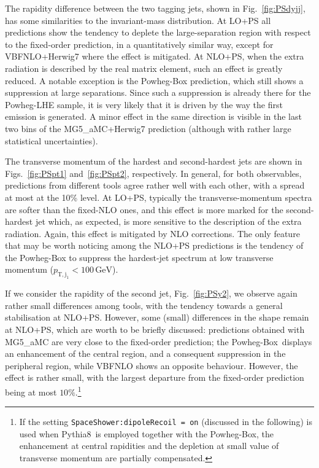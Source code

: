 \documentclass[twocolumn,epjc3]{svjour3} %
\newcommand{\Pj}{\ensuremath{\text{j}}\xspace}
\newcommand{\GeV}{\ensuremath{\,\text{GeV}}\xspace}
\newcommand{\ptsub}[1]{\ensuremath{p_{\text{T},#1}}\xspace}
\begin{document}
The rapidity difference between the two tagging jets, shown in Fig.~\ref{fig:PSdyjj}, has some similarities to the invariant-mass distribution.
At LO+PS all predictions show the tendency to deplete the large-separation region with respect to the fixed-order prediction, in a
quantitatively similar way,
except for {\sc VBFNLO+Herwig7} where the effect is mitigated. At 
NLO+PS, when the extra radiation is described by the real matrix element, such an effect is greatly reduced. A notable
exception is the {\sc Powheg-Box} prediction, which still shows a suppression at large separations.
Since such a suppression is already there for the {\sc Powheg-LHE} sample,
it is very likely that it is driven by the way the first emission is generated. A minor effect in the same direction is visible in the last two bins of the
{\sc MG5\_aMC+Herwig7} prediction (although with rather large statistical uncertainties).



The transverse momentum of the hardest and second-hardest jets are shown in Figs.~\ref{fig:PSpt1} and~\ref{fig:PSpt2}, respectively. In general, for both observables,
predictions from different tools agree rather well with each other, with a spread at most at the 10\% level. At LO+PS, typically the transverse-momentum spectra are softer than
the fixed-NLO ones, and this effect is more marked for the second-hardest jet which, as expected, is more sensitive to the description of the extra radiation. Again, this
effect is mitigated by NLO corrections. The only feature that may be worth noticing among the NLO+PS predictions is the tendency of the {\sc Powheg-Box} to suppress the
hardest-jet spectrum at low transverse momentum ($\ptsub{\Pj_1}<100 \GeV$).

If we consider the rapidity of the second jet, Fig.~\ref{fig:PSy2}, we observe again rather small differences among tools, with the tendency towards a general
stabilisation at NLO+PS. However, some (small) differences in the shape remain at NLO+PS, which are worth to be briefly discussed: predictions
obtained with {\sc MG5\_aMC} are very close to the fixed-order prediction; the {\sc Powheg-Box}\ displays an enhancement of the central region, and a consequent suppression in the
peripheral region, while {\sc VBFNLO} shows an opposite behaviour. However, the effect is rather small, with the largest departure from the fixed-order prediction being
at most $10\%$.\footnote{If the setting {\tt SpaceShower:dipole\-Recoil = on} (discussed in the following)
is used when {\sc Pythia8}\ is employed together with the {\sc Powheg-Box}, the enhancement at central rapidities and the depletion
at small value of transverse momentum are partially compensated.}
\end{document}
